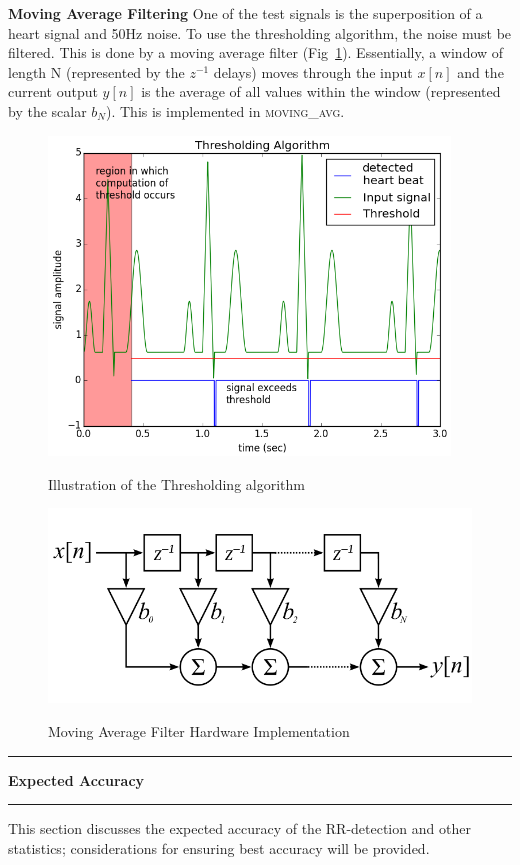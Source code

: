 \documentclass[11pt]{article}
\newcommand\question[2]{\vspace{.25in}\hrule\textbf{#1}\vspace{.5em}\hrule\vspace{.10in}}
\renewcommand\part[1]{\vspace{.10in}\textbf{#1}}
\begin{document}
\part{Moving Average Filtering} \newline
One of the test signals is the superposition of a heart signal and 50Hz noise. To use the thresholding algorithm, the noise must be filtered. This is done by a moving average filter (Fig~\ref{fig:filter}). Essentially, a window of length N (represented by the $z^{-1}$ delays) moves through the input $x[n]$ and the current output $y[n]$ is the average of all values within the window (represented by the scalar $b_N$). This is implemented in \textsc{moving\_avg}.
%
%
%
\begin{figure}[H]
%
\begin{minipage}{0.5\textwidth}
\centering
\includegraphics[width=0.95\textwidth]{figs/thresholding.png}
\caption{Illustration of the Thresholding algorithm}
\label{fig:thresholding}
\end{minipage}
%
\begin{minipage}{0.5\textwidth}
\centering
\caption{Moving Average Filter Hardware Implementation}
\includegraphics[width=\textwidth]{figs/FIR_Filter.png}
\label{fig:filter}
\end{minipage}
\end{figure}
%
\question{Expected Accuracy}{}
This section discusses the expected accuracy of the RR-detection and other statistics; considerations for ensuring best accuracy will be provided.
\end{document}
